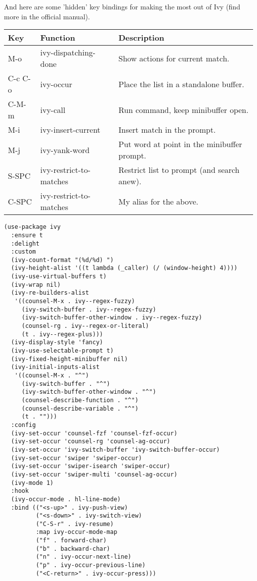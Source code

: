 \documentclass[12pt]{article}
\begin{document}
And here are some 'hidden' key bindings for making the most out of Ivy
(find more in the official manual).

\begin{center}
\begin{tabular}{lll}
Key & Function & Description\\
\hline
M-o & ivy-dispatching-done & Show actions for current match.\\
C-c C-o & ivy-occur & Place the list in a standalone buffer.\\
C-M-m & ivy-call & Run command, keep minibuffer open.\\
M-i & ivy-insert-current & Insert match in the prompt.\\
M-j & ivy-yank-word & Put word at point in the minibuffer prompt.\\
S-SPC & ivy-restrict-to-matches & Restrict list to prompt (and search anew).\\
C-SPC & ivy-restrict-to-matches & My alias for the above.\\
\end{tabular}
\end{center}

\begin{verbatim}
(use-package ivy
  :ensure t
  :delight
  :custom
  (ivy-count-format "(%d/%d) ")
  (ivy-height-alist '((t lambda (_caller) (/ (window-height) 4))))
  (ivy-use-virtual-buffers t)
  (ivy-wrap nil)
  (ivy-re-builders-alist
   '((counsel-M-x . ivy--regex-fuzzy)
     (ivy-switch-buffer . ivy--regex-fuzzy)
     (ivy-switch-buffer-other-window . ivy--regex-fuzzy)
     (counsel-rg . ivy--regex-or-literal)
     (t . ivy--regex-plus)))
  (ivy-display-style 'fancy)
  (ivy-use-selectable-prompt t)
  (ivy-fixed-height-minibuffer nil)
  (ivy-initial-inputs-alist
   '((counsel-M-x . "^")
     (ivy-switch-buffer . "^")
     (ivy-switch-buffer-other-window . "^")
     (counsel-describe-function . "^")
     (counsel-describe-variable . "^")
     (t . "")))
  :config
  (ivy-set-occur 'counsel-fzf 'counsel-fzf-occur)
  (ivy-set-occur 'counsel-rg 'counsel-ag-occur)
  (ivy-set-occur 'ivy-switch-buffer 'ivy-switch-buffer-occur)
  (ivy-set-occur 'swiper 'swiper-occur)
  (ivy-set-occur 'swiper-isearch 'swiper-occur)
  (ivy-set-occur 'swiper-multi 'counsel-ag-occur)
  (ivy-mode 1)
  :hook
  (ivy-occur-mode . hl-line-mode)
  :bind (("<s-up>" . ivy-push-view)
         ("<s-down>" . ivy-switch-view)
         ("C-S-r" . ivy-resume)
         :map ivy-occur-mode-map
         ("f" . forward-char)
         ("b" . backward-char)
         ("n" . ivy-occur-next-line)
         ("p" . ivy-occur-previous-line)
         ("<C-return>" . ivy-occur-press)))


\end{verbatim}
\end{document}
